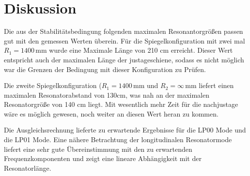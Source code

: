 \section{Diskussion}
Die aus der Stabilitätsbedingung folgenden maximalen Resonantorgrößen passen gut mit den gemessen Werten überein.
Für die Spiegelkonfiguration mit zwei mal $R_1 = 1400 \, \text{mm}$ wurde eine Maximale Länge von 210 cm erreicht.
Dieser Wert entspricht auch der maximalen Länge der justageschiene, sodass es nicht möglich war die Grenzen der Bedingung mit dieser
Konfiguration zu Prüfen.

Die zweite Spiegelkonfiguration ($R_1 = 1400 \, \text{mm}$ und $R_2 = \infty \, \text{mm}$ liefert einen maximalen Resonatorabstand von 130cm,
was nah an der maximalen Resonatorgröße von 140 cm liegt. Mit wesentlich mehr Zeit für die  nachjustage wäre es möglich gewesen, noch weiter an diesen Wert heran zu kommen.

Die Ausgleichsrechnung lieferte zu erwartende Ergebnisse für die LP00 Mode und die LP01 Mode.
Eine nähere Betrachtung der longitudinalen Resonatormode liefert eine sehr gute Übereinstimmung mit den zu erwartenden Frequenzkomponenten
und zeigt eine lineare Abhängigkeit mit der Resonatorlänge.